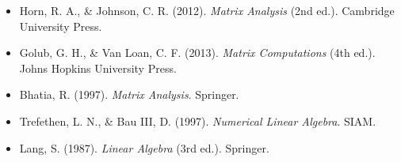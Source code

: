 \documentclass[12pt,a4paper]{article}
\theoremstyle{definition}
\begin{document}
\begin{itemize}
\item Horn, R. A., \& Johnson, C. R. (2012). \textit{Matrix Analysis} (2nd ed.). Cambridge University Press.
\item Golub, G. H., \& Van Loan, C. F. (2013). \textit{Matrix Computations} (4th ed.). Johns Hopkins University Press.
\item Bhatia, R. (1997). \textit{Matrix Analysis}. Springer.
\item Trefethen, L. N., \& Bau III, D. (1997). \textit{Numerical Linear Algebra}. SIAM.
\item Lang, S. (1987). \textit{Linear Algebra} (3rd ed.). Springer.
\end{itemize}
\end{document}

